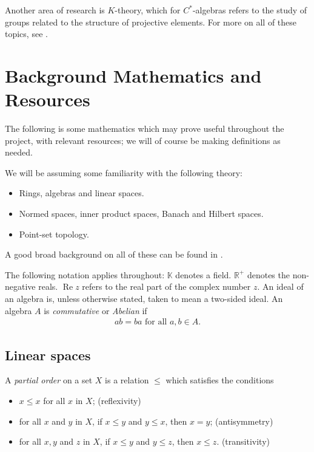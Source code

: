 \documentclass[11pt,a4paper]{report}
\theoremstyle{plain}
\theoremstyle{definition}
\newcommand{\1}{\mathbbm{1}}
\newcommand{\R}{\mathbb{R}}
\DeclareMathOperator{\Real}{\operatorname{Re}}
\begin{document}
Another area of research is $K$-theory, which for $C^\ast$-algebras refers to the study of groups 
related to the structure of projective elements. 
For more on all of these topics, see \cite{davidson96,dixmier81,sakai71}.




\chapter{Background Mathematics and Resources} %
The following is some mathematics which may prove useful throughout the project, with relevant 
resources; we will of course be making definitions as needed.
	
We will be assuming some familiarity with the following theory:
\begin{itemize}
	\item Rings, algebras and linear spaces.
	\item Normed spaces, inner product spaces, Banach and Hilbert spaces.
	\item Point-set topology.
\end{itemize}
A good broad background on all of these can be found in \cite{rudin91,simmons83}.


	
	
The following notation applies throughout:
$\mathbb{K}$ denotes a field. $\R^+$ denotes the non-negative reals. 
$\Real z$ refers to the real part of the complex number $z$.
An ideal of an algebra is, unless otherwise stated, taken to mean a two-sided ideal. 
An algebra $A$ is \emph{commutative} or \emph{Abelian} if 
\begin{align*}
	ab = ba \mbox{ for all } a,b\in A.
\end{align*}

\section{Linear spaces}

A \emph{partial order} on a set $X$ is a relation $\leq$ which satisfies the conditions
\begin{itemize}
	\item $x \leq x$ for all $x$ in $X$; 		\hfill (reflexivity)
	\item for all $x$ and $y$ in $X$, if $x \leq y$ and $y\leq x$, then $x=y$; 
												\hfill (antisymmetry)
	\item for all $x,y$ and $z$ in $X$, if $x \leq y$ and $y\leq z$, then $x\leq z$. 
												\hfill (transitivity)
\end{itemize}
\end{document}
